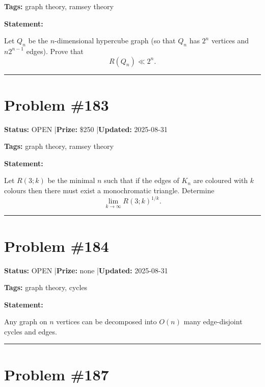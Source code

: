 \documentclass{article}
\begin{document}
\noindent\textbf{Tags:} graph theory, ramsey theory

\medskip

\noindent\textbf{Statement:}

Let $Q_n$ be the $n$-dimensional hypercube graph (so that $Q_n$ has $2^n$ vertices and $n2^{n-1}$ edges). Prove that\[R(Q_n) \ll 2^n.\]

\noindent\rule{\linewidth}{0.4pt}


\section{Problem \#183}
\label{prob:183}

\noindent\textbf{Status:} OPEN \quad|\quad \textbf{Prize:} \$250 \quad|\quad \textbf{Updated:} 2025-08-31

\noindent\textbf{Tags:} graph theory, ramsey theory

\medskip

\noindent\textbf{Statement:}

Let $R(3;k)$ be the minimal $n$ such that if the edges of $K_n$ are coloured with $k$ colours then there must exist a monochromatic triangle. Determine\[\lim_{k\to \infty}R(3;k)^{1/k}.\]

\noindent\rule{\linewidth}{0.4pt}


\section{Problem \#184}
\label{prob:184}

\noindent\textbf{Status:} OPEN \quad|\quad \textbf{Prize:} none \quad|\quad \textbf{Updated:} 2025-08-31

\noindent\textbf{Tags:} graph theory, cycles

\medskip

\noindent\textbf{Statement:}

Any graph on $n$ vertices can be decomposed into $O(n)$ many edge-disjoint cycles and edges.

\noindent\rule{\linewidth}{0.4pt}


\section{Problem \#187}
\label{prob:187}
\end{document}
